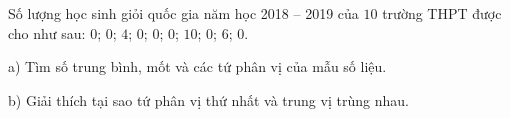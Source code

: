 \begin{ex}
Số lượng học sinh giỏi quốc gia năm học 2018 -- 2019 của $10$ trường THPT được cho như sau: $0$; $0$; $4$; $0$; $0$; $0$; $10$; $0$; $6$; $0$.

a) Tìm số trung bình, mốt và các tứ phân vị của mẫu số liệu.

b) Giải thích tại sao tứ phân vị thứ nhất và trung vị trùng nhau.
\end{ex}
